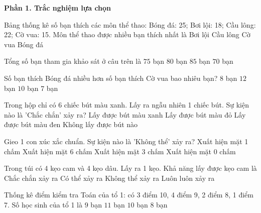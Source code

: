 \textbf{Phần 1. Trắc nghiệm lựa chọn}

\begin{ex} %
Bảng thống kê số bạn thích các môn thể thao: Bóng đá: 25; Bơi lội: 18; Cầu lông: 22; Cờ vua: 15. Môn thể thao được nhiều bạn thích nhất là
\choice
{Bơi lội}
{Cầu lông}
{Cờ vua}
{\True Bóng đá}
\end{ex}

\begin{ex} %
Tổng số bạn tham gia khảo sát ở câu trên là
\choice
{$75$ bạn}
{\True $80$ bạn}
{$85$ bạn}
{$70$ bạn}
\end{ex}

\begin{ex} %
Số bạn thích Bóng đá nhiều hơn số bạn thích Cờ vua bao nhiêu bạn?
\choice
{$8$ bạn}
{$12$ bạn}
{\True $10$ bạn}
{$7$ bạn}
\end{ex}

\begin{ex} %
Trong hộp chỉ có 6 chiếc bút màu xanh. Lấy ra ngẫu nhiên 1 chiếc bút. Sự kiện nào là 'Chắc chắn' xảy ra?
\choice
{\True Lấy được bút màu xanh}
{Lấy được bút màu đỏ}
{Lấy được bút màu đen}
{Không lấy được bút nào}
\end{ex}

\begin{ex} %
Gieo 1 con xúc xắc chuẩn. Sự kiện nào là 'Không thể' xảy ra?
\choice
{Xuất hiện mặt 1 chấm}
{Xuất hiện mặt 6 chấm}
{Xuất hiện mặt 3 chấm}
{\True Xuất hiện mặt 0 chấm}
\end{ex}

\begin{ex} %
Trong túi có 4 kẹo cam và 4 kẹo dâu. Lấy ra 1 kẹo. Khả năng lấy được kẹo cam là
\choice
{Chắc chắn xảy ra}
{\True Có thể xảy ra}
{Không thể xảy ra}
{Luôn luôn xảy ra}
\end{ex}

\begin{ex} %
Thống kê điểm kiểm tra Toán của tổ 1: có 3 điểm 10, 4 điểm 9, 2 điểm 8, 1 điểm 7. Số học sinh của tổ 1 là
\choice
{$9$ bạn}
{$11$ bạn}
{\True $10$ bạn}
{$8$ bạn}
\end{ex}

